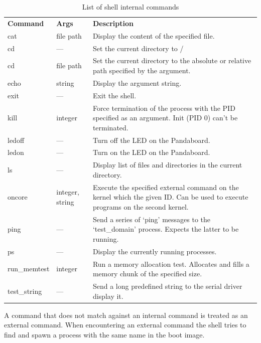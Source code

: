 \documentclass[a4paper,10pt]{article}
\begin{document}
\begin{table}[h]
	\centering
	\begin{tabular}{| m{2.0cm} | m{1.5cm} | m{7.0cm} |}
		\hhline{===}
		\textbf{Command} 	& \textbf{Args} 	& \textbf{Description}	\\
		\hhline{===}
		cat 				& file path 							& Display the content of the specified file.\\ \hline
		cd 				& ---  & Set the current directory to / \\ \hline
		cd 				& file path &  Set the current directory to the absolute or relative path specified by the argument.	\\ \hline
		echo 				& string 							& Display the argument string. \\ \hline
		exit 				& --- 							& Exit the shell. \\ \hline
		kill 				& integer 							& Force termination of the process with the PID specified as an argument. Init (PID 0) can't be terminated. \\ \hline
		ledoff			& ---								& Turn off the LED on the Pandaboard.\\ \hline
		ledon				& --- 							& Turn on the LED on the Pandaboard.\\ \hline
		ls 				& --- 							& Display list of files and directories in the current directory. \\ \hline
		oncore			& integer, string 					& Execute the specified external command on the kernel which the given ID. Can be used to execute programs on the second kernel.\\ \hline
		ping 				& --- 							& Send a series of `ping' messages to the `test\_domain' process. Expects the latter to be running.\\ \hline
		ps 				& --- 							& Display the currently running processes.\\ \hline
		run\_memtest		& integer 							& Run a memory allocation test. Allocates and fills a memory chunk of the specified size.\\ \hline
		test\_string		& --- 							& Send a long predefined string to the serial driver display it.\\ \hline            		
	\end{tabular}
	\caption{List of shell internal commands}
	\label{tbl:icl}
\end{table}


A command that does not match against an internal command is treated as an external command.
When encountering an external command the shell tries to find and spawn a process with the same name in the boot image.
\end{document}
